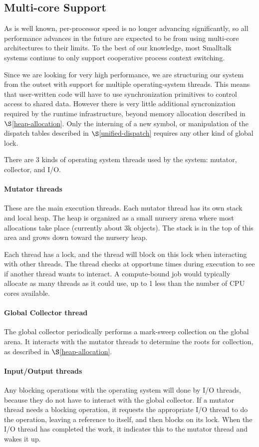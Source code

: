 \documentclass[
]{ceurart}
\def\secref{$\S$\ref}
\begin{document}
\subsection{Multi-core Support}\label{multi-core}
As is well known, per-processor speed is no longer advancing significantly, so all performance advances in the future are expected to be from using multi-core architectures to their limits.
To the best of our knowledge, most Smalltalk systems continue to only support cooperative process context switching.

Since we are looking for very high performance, we are structuring our system from the outset with support for multiple operating-system threads.
This means that user-written code will have to use synchronization primitives to control access to shared data.
However there is very little additional syncronization required by the runtime infrastructure, beyond memory allocation described in \secref{heap-allocation}.
Only the interning of a new symbol, or manipulation of the dispatch tables described in \secref{unified-dispatch} requires any other kind of global lock.

There are 3 kinds of operating system threads used by the system: mutator, collector, and I/O.
\paragraph{Mutator threads}
These are the main execution threads.
Each mutator thread has its own stack and local heap.
The heap is organized as a small nursery arena where most allocations take place (currently about 3k objects).
The stack is in the top of this area and grows down toward the nursery heap.

Each thread has a lock, and the thread will block on this lock when interacting with other threads.
The thread checks at opportune times during execution to see if another thread wants to interact.
A compute-bound job would typically allocate as many threads as it could use, up to 1 less than the number of CPU cores available.
\paragraph{Global Collector thread}
The global collector periodically performs a mark-sweep collection on the global arena.
It interacts with the mutator threads to determine the roots for collection, as described in \secref{heap-allocation}.
\paragraph{Input/Output threads}
Any blocking operations with the operating system will done by I/O threads, because they do not have to interact with the global collector.
If a mutator thread needs a blocking operation, it requests the appropriate I/O thread to do the operation, leaving a reference to itself, and then blocks on its lock.
When the I/O thread has completed the work, it indicates this to the mutator thread and wakes it up.
\end{document}

